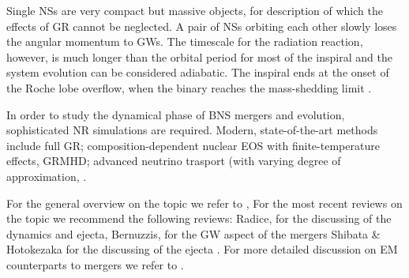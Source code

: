 Single \acp{NS} are very compact but massive objects, 
for description of which the effects of \ac{GR} cannot be neglected.
A pair of \acp{NS} orbiting each other slowly loses the 
angular momentum to \acp{GW}. The timescale for the radiation reaction, however, 
is much longer than the orbital period for most of the inspiral and the 
system evolution can be considered adiabatic. 
The inspiral ends at the onset of the Roche lobe overflow, when the binary 
reaches the mass-shedding limit \cite{Bejger:2004zx}.

In order to study the dynamical phase of \ac{BNS} mergers and \pmerg{} evolution, 
sophisticated \ac{NR} simulations are required. Modern, state-of-the-art methods 
include full \ac{GR}; composition-dependent nuclear \ac{EOS} with finite-temperature 
effects, \ac{GRMHD}; advanced neutrino trasport (with varying degree of approximation,
\cite{Sekiguchi:2011zd, Wanajo:2014wha, Foucart:2015gaa, Palenzuela:2015dqa, Sekiguchi:2016bjd, Kiuchi:2017zzg, Radice:2017zta, Fujibayashi:2017puw}.


For the general overview on the topic we refer to \cite{Shibata:2016},
For the most recent reviews on the topic we recommend the following reviews:
Radice, for the discussing of the \pmerg{} dynamics and ejecta,
Bernuzzis, for the \ac{GW} aspect of the mergers \cite{Bernuzzi:2020tgt}
Shibata \& Hotokezaka for the discussing of the ejecta \cite{Shibata:2019wef}.
For more detailed discussion on \ac{EM} counterparts to mergers we refer to \cite{Kumar:2014upa,Fernandez:2015use,Metzger:2019zeh}.


